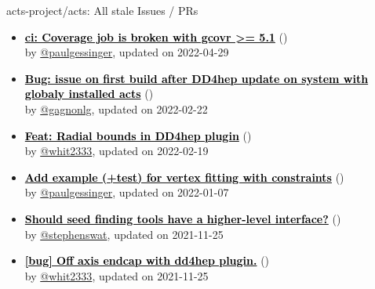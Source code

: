 \begin{frame}[allowframebreaks]{ acts-project/acts: All stale Issues / PRs}
\begin{itemize}
    \item\iss\prstale\textbf{\href{https://github.com/acts-project/acts/issues/1211}{\textcolor{black}{ci: Coverage job is broken with gcovr \textgreater{}= 5.1}}}
    (\href{https://github.com/acts-project/acts/issues/1211}{}) \\
    by \href{https://github.com/paulgessinger}{@paulgessinger}, updated on 2022-04-29

    \item\iss\prstale\textbf{\href{https://github.com/acts-project/acts/issues/1139}{\textcolor{black}{Bug: issue on first build after DD4hep update on system with globaly installed acts}}}
    (\href{https://github.com/acts-project/acts/issues/1139}{}) \\
    by \href{https://github.com/gagnonlg}{@gagnonlg}, updated on 2022-02-22

    \item\iss\prstale\textbf{\href{https://github.com/acts-project/acts/issues/822}{\textcolor{black}{Feat: Radial bounds in DD4hep plugin}}}
    (\href{https://github.com/acts-project/acts/issues/822}{}) \\
    by \href{https://github.com/whit2333}{@whit2333}, updated on 2022-02-19

    \item\iss\prstale\textbf{\href{https://github.com/acts-project/acts/issues/1100}{\textcolor{black}{Add example (+test) for vertex fitting with constraints}}}
    (\href{https://github.com/acts-project/acts/issues/1100}{}) \\
    by \href{https://github.com/paulgessinger}{@paulgessinger}, updated on 2022-01-07

    \item\iss\prstale\textbf{\href{https://github.com/acts-project/acts/issues/988}{\textcolor{black}{Should seed finding tools have a higher-level interface?}}}
    (\href{https://github.com/acts-project/acts/issues/988}{}) \\
    by \href{https://github.com/stephenswat}{@stephenswat}, updated on 2021-11-25

    \item\iss\prstale\textbf{\href{https://github.com/acts-project/acts/issues/942}{\textcolor{black}{[bug] Off axis endcap with dd4hep plugin.}}}
    (\href{https://github.com/acts-project/acts/issues/942}{}) \\
    by \href{https://github.com/whit2333}{@whit2333}, updated on 2021-11-25


\end{itemize}
\end{frame}
